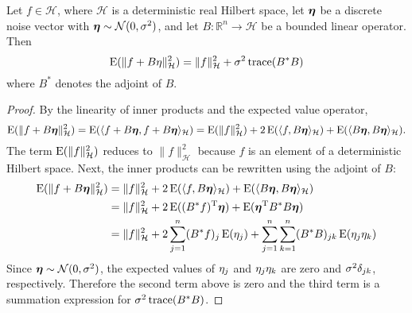 \begin{TL}
Let $f \in \mathcal{H}$, where $\mathcal{H}$ is a deterministic real Hilbert space, let $\bm{\eta}$ be a discrete noise vector with $\bm{\eta} \sim \mathcal{N}(0,\sigma^2)$, and let $B: \mathbb{R}^n \rightarrow \mathcal{H}$ be a bounded linear operator. Then
\[\operatorname{E}(\|f + B\eta\|_{\mathcal{H}}^2) = \|f\|_{\mathcal{H}}^2 + \sigma^2\operatorname{trace}({B^*}B)\]
where $B^*$ denotes the adjoint of $B$.
\end{TL}
\begin{proof}
By the linearity of inner products and the expected value operator,
\[\operatorname{E}(\|f + B\bm{\eta}\|_{\mathcal{H}}^2) = \operatorname{E}(\langle f + B\bm{\eta}, f + B\bm{\eta}\rangle_{\mathcal{H}}) = \operatorname{E}(\|f\|_{\mathcal{H}}^2) + 2\operatorname{E}(\langle f, B\bm{\eta}\rangle_{\mathcal{H}}) + \operatorname{E}(\langle B\bm{\eta}, B\bm{\eta}\rangle_{\mathcal{H}}).\]
The term $\operatorname{E}(\|f\|_{\mathcal{H}}^2)$ reduces to $\|f\|_{\mathcal{H}}^2$ because $f$ is an element of a deterministic Hilbert space. Next, the inner products can be rewritten using the adjoint of $B$:
\begin{align*}
\operatorname{E}(\|f + B\bm{\eta}\|_{\mathcal{H}}^2) &= \|f\|_{\mathcal{H}}^2 + 2\operatorname{E}(\langle f, B\bm{\eta}\rangle_{\mathcal{H}}) + \operatorname{E}(\langle B\bm{\eta}, B\bm{\eta}\rangle_{\mathcal{H}}) \\
&= \|f\|_{\mathcal{H}}^2 + 2\operatorname{E}(({B^*}f)^{\mathrm{T}}\bm{\eta}) + \operatorname{E}({\bm{\eta}^{\mathrm{T}}}{B^*}B\bm{\eta}) \\
&= \|f\|_{\mathcal{H}}^2 + 2\sum_{j=1}^n ({B^*}f)_j \operatorname{E}(\eta_j) + \sum_{j=1}^n\sum_{k=1}^n ({B^*}B)_{jk} \operatorname{E}({\eta_j}{\eta_k})
\end{align*}
Since $\bm{\eta} \sim \mathcal{N}(0,\sigma^2)$, the expected values of $\eta_j$ and ${\eta_j}{\eta_k}$ are zero and $\sigma^2\delta_{jk}$, respectively. Therefore the second term above is zero and the third term is a summation expression for $\sigma^2\operatorname{trace}({B^*}B)$.
\end{proof}


